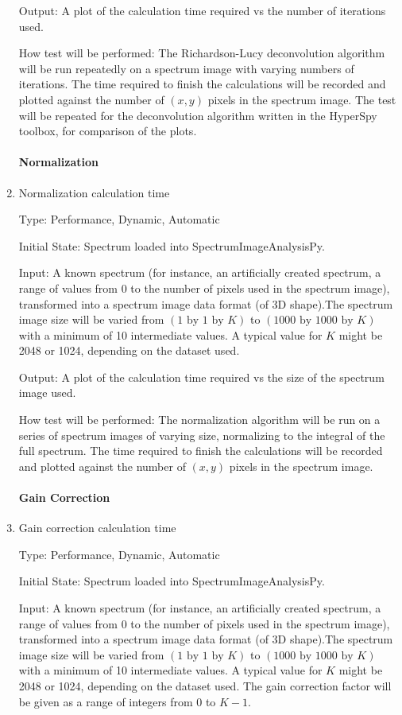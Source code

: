 \documentclass[12pt, titlepage]{article}
\newcommand{\progname}{SpectrumImageAnalysisPy}
\begin{document}
\begin{enumerate}
Output: A plot of the calculation time required vs the number of iterations
used.

How test will be performed: The Richardson-Lucy deconvolution algorithm will be
run repeatedly on a spectrum image with varying numbers of iterations. The time
required to finish the calculations will be recorded and plotted against the
number of $(x, y)$ pixels in the spectrum image.  The test will be repeated for
the deconvolution algorithm written in the HyperSpy toolbox, for comparison of
the plots.\\

\paragraph{Normalization}
\item{Normalization calculation time}

Type: Performance, Dynamic, Automatic

Initial State: Spectrum loaded into \progname{}.

Input: A known spectrum (for instance, an artificially created spectrum, a range
of values from 0 to the number of pixels used in the spectrum image),
transformed into a spectrum image data format (of 3D shape).The spectrum image
size will be varied from $(1\text{ by }1\text{ by }K)$ to $(1000 \text{ by }
1000 \text{ by }K)$ with a minimum of 10 intermediate values. A typical value
for $K$ might be 2048 or 1024, depending on the dataset used.

Output: A plot of the calculation time required vs the size of the spectrum
image used.

How test will be performed: The normalization algorithm will be run on a series
of spectrum images of varying size, normalizing to the integral of the full
spectrum. The time required to finish the calculations will be recorded and
plotted against the number of $(x, y)$ pixels in the spectrum image.\\

\paragraph{Gain Correction}
\item{Gain correction calculation time}

Type: Performance, Dynamic, Automatic

Initial State: Spectrum loaded into \progname{}.

Input: A known spectrum (for instance, an artificially created spectrum, a range
of values from 0 to the number of pixels used in the spectrum image),
transformed into a spectrum image data format (of 3D shape).The spectrum image
size will be varied from $(1\text{ by }1\text{ by }K)$ to $(1000 \text{ by }
1000 \text{ by }K)$ with a minimum of 10 intermediate values. A typical value
for $K$ might be 2048 or 1024, depending on the dataset used. The gain
correction factor will be given as a range of integers from 0 to $K-1$.


\end{enumerate}
\end{document}
